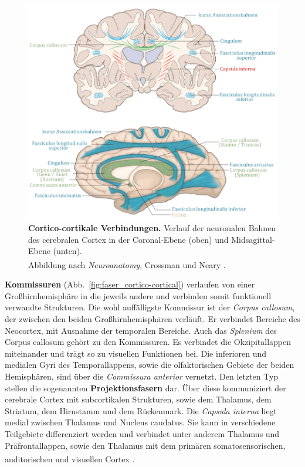 \documentclass[12pt,a4paper,pdftex]{article}
\begin{document}
\begin{figure}[H]
    \centering
    \includegraphics[width=\textwidth]{pictures/Bilder_Jule/Andere/cortico-cortical_(crossm13).png}
    \caption[Cortico-cortikale Verbindungen]{\textbf{Cortico-cortikale Verbindungen.} Verlauf der neuronalen Bahnen des cerebralen Cortex in der Coronal-Ebene (oben) und Midsagittal-Ebene (unten).\\
    Abbildung nach \textit{Neuroanatomy}, Crossman und Neary \textsuperscript{\cite[13]{crossman2014neuroanatomy}}.}
    \label{fig:cortico-cortical}
\end{figure}{}

\noindent \textbf{Kommissuren} (Abb.~\ref{fig:faser_cortico-cortical}) verlaufen von einer Großhirnhemisphäre in die jeweils andere und verbinden somit funktionell verwandte Strukturen. Die wohl auffälligste Kommissur ist der \textit{Corpus callosum}, der zwischen den beiden Großhirnhemisphären verläuft. Er verbindet Bereiche des Neocortex, mit Ausnahme der temporalen Bereiche. Auch das \textit{Splenium} des Corpus callosum gehört zu den Kommissuren. Es verbindet die Okzipitallappen miteinander und trägt so zu visuellen Funktionen bei. Die inferioren und medialen Gyri des Temporallappens, sowie die olfaktorischen Gebiete der beiden Hemisphären, sind über die \textit{Commissura anterior} vernetzt. Den letzten Typ stellen die sogenannten \textbf{Projektionsfasern} dar. Über diese kommuniziert der cerebrale Cortex mit subcortikalen Strukturen, sowie dem Thalamus, dem Striatum, dem Hirnstamm und dem Rückenmark. Die \textit{Capsula interna} liegt  medial zwischen Thalamus und Nucleus caudatus. Sie kann in verschiedene Teilgebiete differenziert werden und verbindet unter anderem Thalamus und Präfrontallappen, sowie den Thalamus mit dem primären somatosensorischen, auditorischen und visuellen Cortex \textsuperscript{\cite[13]{crossman2014neuroanatomy}}.
\end{document}
